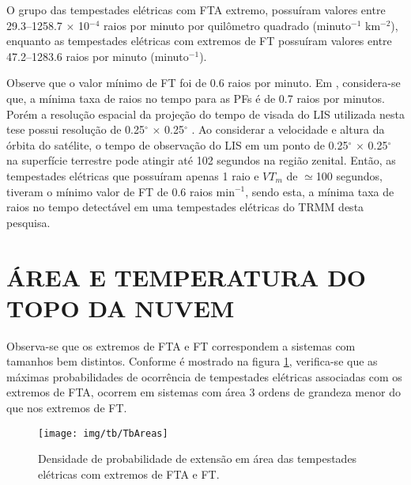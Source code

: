 O grupo das tempestades elétricas com FTA extremo, possuíram valores entre {29.3--1258.7 $\times$ 10$^{-4}$} raios por minuto por quilômetro quadrado (minuto$^{-1}$ km$^{-2}$), enquanto as tempestades elétricas com extremos de FT possuíram valores entre {47.2--1283.6} raios por minuto (minuto$^{-1}$). 



Observe que o valor mínimo de FT foi de 0.6 raios por minuto. Em , considera-se que, a mínima taxa de raios no tempo para as PFs é de 0.7 raios por minutos. Porém a resolução espacial da projeção do tempo de visada do LIS utilizada nesta tese possui resolução de 0.25$^{\circ}$ $\times$ 0.25$^{\circ}$  \cite{albrecht2009tropical,albrecht2011b}. Ao considerar a velocidade e altura da órbita do satélite, o tempo de observação do LIS em um ponto de 0.25$^{\circ}$ $\times$ 0.25$^{\circ}$ na superfície terrestre pode atingir até 102 segundos na região zenital. Então, as tempestades elétricas que possuíram apenas 1 raio e $VT_m$ de $\simeq$100 segundos, tiveram o mínimo valor de FT de 0.6 raios min$^{-1}$, sendo esta, a mínima taxa de raios no tempo detectável em uma tempestades elétricas do TRMM desta pesquisa.




\section{ÁREA E TEMPERATURA DO TOPO DA NUVEM}

Observa-se que os extremos de FTA e FT correspondem a sistemas com tamanhos bem distintos. Conforme é mostrado na figura \ref{size}, verifica-se que as máximas probabilidades de ocorrência de tempestades elétricas associadas com os extremos de FTA, ocorrem em sistemas com área 3 ordens de grandeza menor do que nos extremos de FT.

\begin{figure}[!ht]
  \centering
  \texttt{[image: img/tb/TbAreas]}   
  \caption{Densidade de probabilidade de extensão em área das tempestades elétricas com extremos de FTA e FT.}
  \label{size}  
\end{figure}


